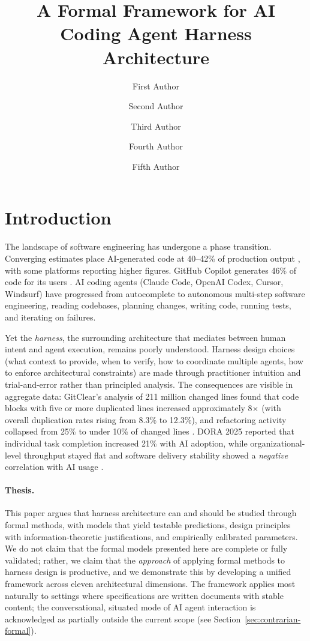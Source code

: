 \documentclass[11pt, a4paper]{googledeepmind}
\title{A Formal Framework for AI Coding Agent Harness Architecture}
\author[1]{First Author}
\author[2]{Second Author}
\author[2]{Third Author}
\author[1]{Fourth Author}
\author[1]{Fifth Author}
\affil[*]{Equal Contribution}
\affil[1]{Affiliation 1}
\affil[2]{Affiliation 2}
\begin{document}
\maketitle

\section{Introduction}
\label{sec:intro}

The landscape of software engineering has undergone a phase transition. Converging estimates place AI-generated code at 40--42\% of production output \citep{gitclear2025, sonar2026}, with some platforms reporting higher figures. GitHub Copilot generates 46\% of code for its users \citep{github2024rct}. AI coding agents (Claude Code, OpenAI Codex, Cursor, Windsurf) have progressed from autocomplete to autonomous multi-step software engineering, reading codebases, planning changes, writing code, running tests, and iterating on failures.

Yet the \emph{harness}, the surrounding architecture that mediates between human intent and agent execution, remains poorly understood. Harness design choices (what context to provide, when to verify, how to coordinate multiple agents, how to enforce architectural constraints) are made through practitioner intuition and trial-and-error rather than principled analysis. The consequences are visible in aggregate data: GitClear's analysis of 211 million changed lines found that code blocks with five or more duplicated lines increased approximately 8$\times$ (with overall duplication rates rising from 8.3\% to 12.3\%), and refactoring activity collapsed from 25\% to under 10\% of changed lines \citep{gitclear2025}. DORA 2025 reported that individual task completion increased 21\% with AI adoption, while organizational-level throughput stayed flat and software delivery stability showed a \emph{negative} correlation with AI usage \citep{dora2025}.

\paragraph{Thesis.} This paper argues that harness architecture can and should be studied through formal methods, with models that yield testable predictions, design principles with information-theoretic justifications, and empirically calibrated parameters. We do not claim that the formal models presented here are complete or fully validated; rather, we claim that the \emph{approach} of applying formal methods to harness design is productive, and we demonstrate this by developing a unified framework across eleven architectural dimensions. The framework applies most naturally to settings where specifications are written documents with stable content; the conversational, situated mode of AI agent interaction \citep{suchman1987plans} is acknowledged as partially outside the current scope (see Section~\ref{sec:contrarian-formal}).
\end{document}
